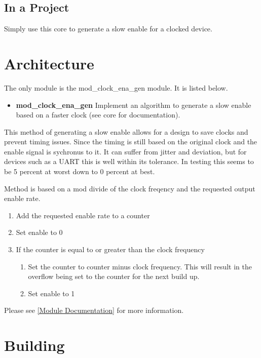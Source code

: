

\subsection{In a Project}
\par
Simply use this core to generate a slow enable for a clocked device.

\section{Architecture}
\par
The only module is the mod\_clock\_ena\_gen module. It is listed below.

\begin{itemize}
  \item \textbf{mod\_clock\_ena\_gen} Implement an algorithm to generate a slow enable based on a faster clock (see core for documentation).
\end{itemize}

\par
This method of generating a slow enable allows for a design to save clocks and prevent timing issues. Since the timing is still based on the
original clock and the enable signal is sychronus to it. It can suffer from jitter and deviation, but for devices such as a UART this is well
within its tolerance. In testing this seems to be 5 percent at worst down to 0 percent at best.

\par
Method is based on a mod divide of the clock freqency and the requested output enable rate.
\begin{enumerate}
\item Add the requested enable rate to a counter
\item Set enable to 0
\item If the counter is equal to or greater than the clock frequency
  \begin{enumerate}
    \item Set the counter to counter minus clock frequency. This will result in the overflow being set to the counter for the next build up.
    \item Set enable to 1
  \end{enumerate}
\end{enumerate}

Please see \ref{Module Documentation} for more information.

\section{Building}

